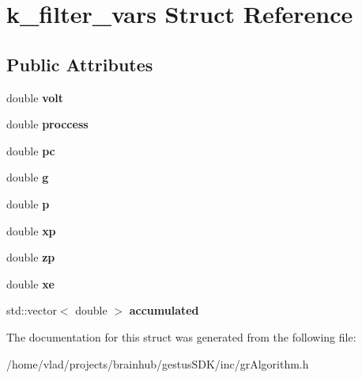 \hypertarget{structk__filter__vars}{}\section{k\+\_\+filter\+\_\+vars Struct Reference}
\label{structk__filter__vars}
\subsection*{Public Attributes}
\begin{DoxyCompactItemize}
\item 
\mbox{\label{structk__filter__vars_a48ef9e5caf126fdcc048c7efef026ec0}} 
double {\bfseries volt}
\item 
\mbox{\label{structk__filter__vars_a5fc0ab443a992ef71683d24e8a78633d}} 
double {\bfseries proccess}
\item 
\mbox{\label{structk__filter__vars_aa162ea5584bb45499cc4665a6b7d5fb7}} 
double {\bfseries pc}
\item 
\mbox{\label{structk__filter__vars_af6fae8f53161a6acc7819c2d99258217}} 
double {\bfseries g}
\item 
\mbox{\label{structk__filter__vars_a04840d6f95607d07e6fcf78cdba82a5e}} 
double {\bfseries p}
\item 
\mbox{\label{structk__filter__vars_a73557b4cfe4e835995befe8c6d2747a2}} 
double {\bfseries xp}
\item 
\mbox{\label{structk__filter__vars_a156b05932418980070b9cc0c61b342bd}} 
double {\bfseries zp}
\item 
\mbox{\label{structk__filter__vars_a96c7ee8ecb897cf118b9ab4da55dd9ba}} 
double {\bfseries xe}
\item 
\mbox{\label{structk__filter__vars_aedef0f703f2400924438514938ebfae0}} 
std\+::vector$<$ double $>$ {\bfseries accumulated}
\end{DoxyCompactItemize}


The documentation for this struct was generated from the following file\+:\begin{DoxyCompactItemize}
\item 
/home/vlad/projects/brainhub/gestus\+S\+D\+K/inc/gr\+Algorithm.\+h\end{DoxyCompactItemize}
